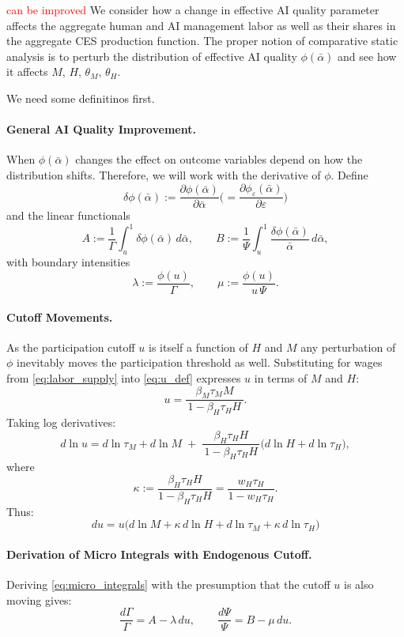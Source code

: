 \documentclass[english]{article}
\begin{document}
\textcolor{red}{can be improved}
We consider how a change in effective AI quality parameter affects the aggregate human and AI management labor as well as their shares in the aggregate CES production function.
The proper notion of comparative static analysis is to perturb the distribution of effective AI quality $\phi(\bar{\alpha})$ and see how it affects $M,\,H,\,\theta_M,\,\theta_H$.

We need some definitinos first. 

\paragraph{General AI Quality Improvement.}
When $\phi(\bar{\alpha})$ changes the effect on outcome variables depend on how the distribution shifts.
Therefore, we will work with the derivative of $\phi$. 
Define
\[
\delta\phi(\bar{\alpha}):= \frac{\partial \phi(\bar{\alpha})}{\partial \bar{\alpha}} \Big(= \frac{\partial \phi_\varepsilon(\bar{\alpha})}{\partial \varepsilon} \Big)
\]
and the linear functionals
\[
A:=\frac{1}{\Gamma}\int_u^{1}\delta\phi(\bar{\alpha})\,d\bar{\alpha},
\qquad
B:=\frac{1}{\Psi}\int_u^{1}\frac{\delta\phi(\bar{\alpha})}{\bar{\alpha}}\,d\bar{\alpha},
\]
with boundary intensities
\[
\lambda:=\frac{\phi(u)}{\Gamma},
\qquad 
\mu:=\frac{\phi(u)}{u\,\Psi}.
\]

\paragraph{Cutoff Movements.}
As the participation cutoff $u$ is itself a function of $H$ and $M$ any perturbation of $\phi$ inevitably moves the participation threshold as well.
Substituting for wages from \eqref{eq:labor_supply} into \eqref{eq:u_def} expresses $u$ in terms of $M$ and $H$:
\[
u=\dfrac{\beta_M\tau_M M}{\,1-\beta_H\tau_H H\,}.
\]
Taking log derivatives:
\[
d\ln u
= d\ln \tau_M + d\ln M \;+\; \frac{\beta_H\tau_H H}{\,1-\beta_H\tau_H H\,}\Big(d\ln H + d\ln \tau_H\Big),
\]
where
\begin{equation}
\kappa:=\frac{\beta_H\tau_H H}{1-\beta_H\tau_H H}=\frac{w_H\tau_H}{1-w_H\tau_H}. \label{eq:kappa}
\end{equation}
Thus:
\begin{equation}
\boxed{
du = u\Big(d\ln M + \kappa\,d\ln H + d\ln \tau_M + \kappa\,d\ln \tau_H\Big)}
\label{eq:du}
\end{equation}

\paragraph{Derivation of Micro Integrals with Endogenous Cutoff.}
Deriving \eqref{eq:micro_integrals} with the presumption that the cutoff $u$ is also moving gives:
\begin{equation}
\frac{d\Gamma}{\Gamma}=A-\lambda\,du,
\qquad
\frac{d\Psi}{\Psi}=B-\mu\,du.\label{eq:micro_int_variation}
\end{equation}
\end{document}
